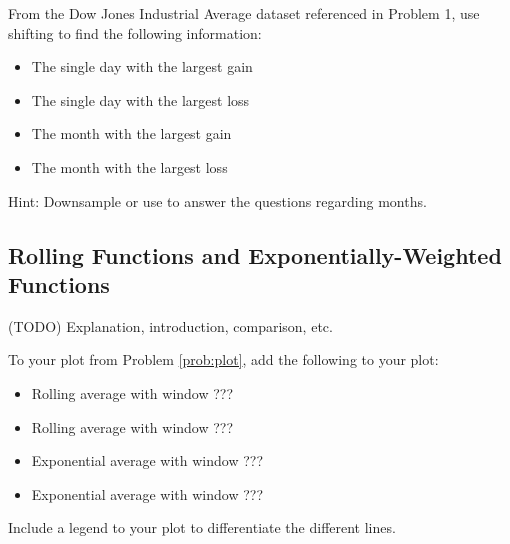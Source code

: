 \begin{problem}
From the Dow Jones Industrial Average dataset referenced in Problem 1, use shifting to find the following information:
    \begin{itemize}
        \item The single day with the largest gain
        \item The single day with the largest loss
        \item The month with the largest gain
        \item The month with the largest loss
    \end{itemize}
Hint: Downsample or use  to answer the questions regarding months.
\end{problem}

\subsection*{Rolling Functions and Exponentially-Weighted Functions}

(TODO) Explanation, introduction, comparison, etc.

\begin{problem}
To your plot from Problem \ref{prob:plot}, add the following to your plot:
    \begin{itemize}
        \item Rolling average with window ???
        \item Rolling average with window ???
        \item Exponential average with window ???
        \item Exponential average with window ???
    \end{itemize}
Include a legend to your plot to differentiate the different lines.
\end{problem}
